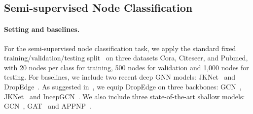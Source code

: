 \documentclass{article}
\begin{document}
  \begin{table}[t]
\caption{Summary of classification accuracy () results on Cora, Citeseer, and Pubmed. 
            The number in parentheses corresponds to the number of
            layers of the model.}
    \label{semi-table}
    \vskip 0.10in
    \begin{small}
    \end{small}
\vskip -0.1in
  \end{table}

\subsection{Semi-supervised Node Classification}
\paragraph{Setting and baselines.}
For the semi-supervised node classification task, we apply the standard fixed training/validation/testing
split~\cite{DBLP:conf/icml/YangCS16} on three datasets Cora, Citeseer, and
 Pubmed,  with 20 nodes per class for
training, 500 nodes for validation and
1,000 nodes  for testing. For baselines, we include two recent deep GNN models: 
JKNet~\cite{DBLP:conf/icml/XuLTSKJ18} and
DropEdge~\cite{rong2020dropedge}. As suggested
in~\cite{rong2020dropedge}, we equip DropEdge on three 
backbones: GCN~\cite{DBLP:conf/iclr/KipfW17}, JKNet~\cite{DBLP:conf/icml/XuLTSKJ18} and IncepGCN~\cite{rong2020dropedge}.
We also include three state-of-the-art shallow models:
GCN~\cite{DBLP:conf/iclr/KipfW17}, GAT~\cite{velickovic2018graph} and
APPNP~\cite{klicpera_predict_2019}.
\end{document}
